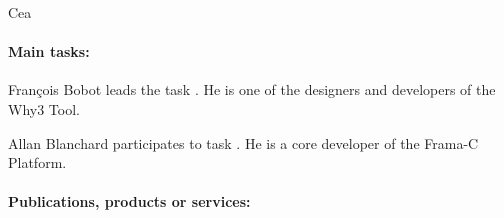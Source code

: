 \begin{sitedescription}{Cea}
\paragraph*{Main tasks:}






\begin{compactitem}
\item François Bobot leads the task .
  He is one of the designers and developers of the Why3 Tool.
\item Allan Blanchard participates to task . He is a core
developer of the Frama-C Platform.
\end{compactitem}

\paragraph*{Publications, products or services:}


\end{sitedescription}
